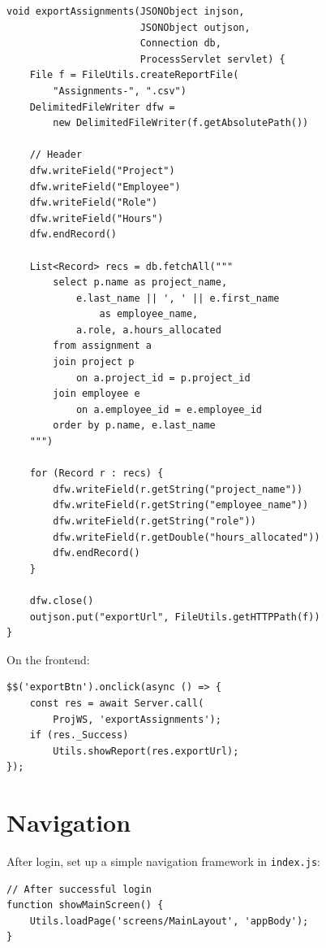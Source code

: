 \begin{lstlisting}[style=groovy]
void exportAssignments(JSONObject injson,
                       JSONObject outjson,
                       Connection db,
                       ProcessServlet servlet) {
    File f = FileUtils.createReportFile(
        "Assignments-", ".csv")
    DelimitedFileWriter dfw =
        new DelimitedFileWriter(f.getAbsolutePath())

    // Header
    dfw.writeField("Project")
    dfw.writeField("Employee")
    dfw.writeField("Role")
    dfw.writeField("Hours")
    dfw.endRecord()

    List<Record> recs = db.fetchAll("""
        select p.name as project_name,
            e.last_name || ', ' || e.first_name
                as employee_name,
            a.role, a.hours_allocated
        from assignment a
        join project p
            on a.project_id = p.project_id
        join employee e
            on a.employee_id = e.employee_id
        order by p.name, e.last_name
    """)

    for (Record r : recs) {
        dfw.writeField(r.getString("project_name"))
        dfw.writeField(r.getString("employee_name"))
        dfw.writeField(r.getString("role"))
        dfw.writeField(r.getDouble("hours_allocated"))
        dfw.endRecord()
    }

    dfw.close()
    outjson.put("exportUrl", FileUtils.getHTTPPath(f))
}
\end{lstlisting}

\noindent
On the frontend:

\begin{lstlisting}[style=javascript]
$$('exportBtn').onclick(async () => {
    const res = await Server.call(
        ProjWS, 'exportAssignments');
    if (res._Success)
        Utils.showReport(res.exportUrl);
});
\end{lstlisting}

\section{Navigation}
\label{sec:app-navigation}

After login, set up a simple navigation framework in \texttt{index.js}:

\begin{lstlisting}[style=javascript]
// After successful login
function showMainScreen() {
    Utils.loadPage('screens/MainLayout', 'appBody');
}
\end{lstlisting}

